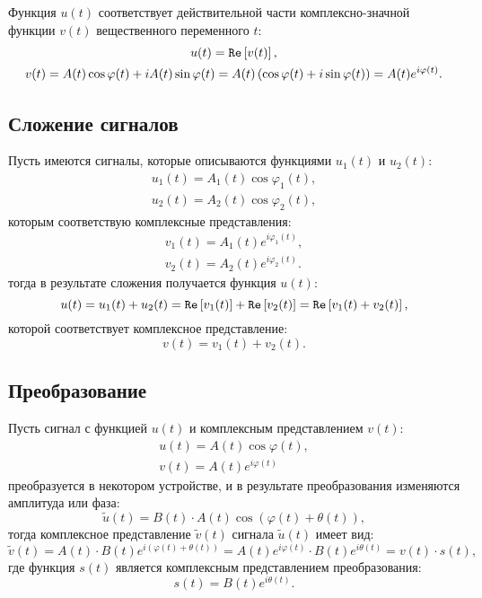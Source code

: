 Функция $u(t)$ соответствует действительной части комплексно-значной функции $v(t)$ вещественного переменного $t$:
\begin{gather*}
    u(t) = \mathtt{Re} \left [ v(t) \right ] , \\
    v(t)
    = A(t) \cos \varphi(t) + i A(t) \sin \varphi(t)
    = A(t) \left ( \cos \varphi(t) + i \sin \varphi(t) \right )
    = A(t) e^{i \varphi(t)} .
\end{gather*}

\subsection{Сложение сигналов}

Пусть имеются сигналы, которые описываются функциями $u_1(t)$ и $u_2(t)$:
\begin{gather*}
    u_1(t) = A_1(t) \cos \varphi_1(t) , \\
    u_2(t) = A_2(t) \cos \varphi_2(t) ,
\end{gather*}
которым соответствую комплексные представления:
\begin{gather*}
    v_1(t) = A_1(t) e^{i \varphi_1(t)} , \\
    v_2(t) = A_2(t) e^{i \varphi_2(t)} .
\end{gather*}
тогда в результате сложения получается функция $u(t)$:
\[
    u(t)
    = u_1(t) + u_2(t)
    = \mathtt{Re} \left [ v_1(t) \right ] + \mathtt{Re} \left [ v_2(t) \right ]
    = \mathtt{Re} \left [ v_1(t) + v_2(t) \right ] ,
\]
которой соответствует комплексное представление:
\[
    v(t) = v_1(t) + v_2(t).
\]

\subsection{Преобразование}

Пусть сигнал с функцией $u(t)$ и комплексным представлением $v(t)$:
\begin{gather*}
    u(t) = A(t) \cos \varphi(t) , \\
    v(t) = A(t) e^{i \varphi(t)}
\end{gather*}
преобразуется в некотором устройстве, и в результате преобразования изменяются амплитуда или фаза:
\[
    \widetilde{u}(t) = B(t) \cdot A(t) \cos ( \varphi(t) + \theta(t) ) ,
\]
тогда комплексное представление $\widetilde{v}(t)$ сигнала $\widetilde{u}(t)$ имеет вид:
\[
    \widetilde{v}(t)
    = A(t) \cdot B(t) e^{i (\varphi(t) + \theta(t))}
    = A(t) e^{i \varphi(t)} \cdot B(t) e^{i \theta(t)} = v(t) \cdot s(t),
\]
где функция $s(t)$ является комплексным представлением преобразования:
\[
    s(t) = B(t) e^{i \theta(t)} .
\]

